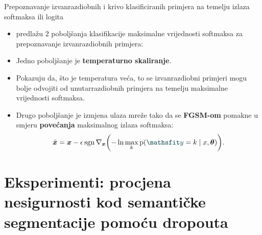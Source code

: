 \documentclass{beamer}
\begin{document}
\begin{frame}{Prepoznavanje izvanrazdiobnih i krivo klasificiranih primjera na temelju izlaza softmaksa ili logita}
\begin{itemize}	
	\item \citet{Liang:2017:PDOODENN} predlažu $2$ poboljšanja klasifikacije maksimalne vrijednosti softmaksa za prepoznavanje izvanrazdiobnih primjera:
	\item Jedno poboljšanje je \textbf{temperaturno skaliranje}. 
	\item Pokazuju da, što je temperatura veća, to se izvanrazdiobni primjeri mogu bolje odvojiti od unutarrazdiobnih primjera na temelju maksimalne vrijednosti softmaksa. 
	\item Drugo poboljšanje je izmjena ulaza mreže tako da se \textbf{FGSM-om} pomakne u smjeru \textbf{povećanja} maksimalnog izlaza softmaksa:
	\begin{equation} \label{eq:ODIN-FGSM}
	\tilde{\vec x} = \vec x - \epsilon\sgn\nabla_{\vec x}\del{-\ln \max_k \p(\rvar y=k\mid x,\vec\theta)} \text{.}
	\end{equation}
\end{itemize}
\end{frame}

\section{Eksperimenti: procjena nesigurnosti kod semantičke segmentacije pomoću dropouta}
\end{document}
